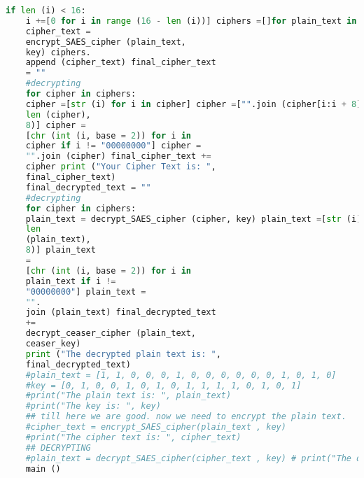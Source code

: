 \documentclass{article}
\begin{document}
\begin{lstlisting}[language=python, caption={Input Code}]
	if len (i) < 16:
	i +=[0 for i in range (16 - len (i))] ciphers =[]for plain_text in plain_texts:
	cipher_text =
	encrypt_SAES_cipher (plain_text,
	key) ciphers.
	append (cipher_text) final_cipher_text
	= ""
	#decrypting
	for cipher in ciphers:
	cipher =[str (i) for i in cipher] cipher =["".join (cipher[i:i + 8]) for i in range (0,
	len (cipher),
	8)] cipher =
	[chr (int (i, base = 2)) for i in
	cipher if i != "00000000"] cipher =
	"".join (cipher) final_cipher_text +=
	cipher print ("Your Cipher Text is: ",
	final_cipher_text)
	final_decrypted_text = ""
	#decrypting
	for cipher in ciphers:
	plain_text = decrypt_SAES_cipher (cipher, key) plain_text =[str (i) for i in plain_text] plain_text =["".join (plain_text[i:i + 8]) for i in range (0,
	len
	(plain_text),
	8)] plain_text
	=
	[chr (int (i, base = 2)) for i in
	plain_text if i !=
	"00000000"] plain_text =
	"".
	join (plain_text) final_decrypted_text
	+=
	decrypt_ceaser_cipher (plain_text,
	ceaser_key)
	print ("The decrypted plain text is: ",
	final_decrypted_text)
	#plain_text = [1, 1, 0, 0, 0, 1, 0, 0, 0, 0, 0, 0, 1, 0, 1, 0]
	#key = [0, 1, 0, 0, 1, 0, 1, 0, 1, 1, 1, 1, 0, 1, 0, 1]
	#print("The plain text is: ", plain_text)
	#print("The key is: ", key)
	## till here we are good. now we need to encrypt the plain text.
	#cipher_text = encrypt_SAES_cipher(plain_text , key)
	#print("The cipher text is: ", cipher_text)
	## DECRYPTING
	#plain_text = decrypt_SAES_cipher(cipher_text , key) # print("The decrypted plain text is: ", plain_text)
	main ()
\end{lstlisting}
\end{document}
